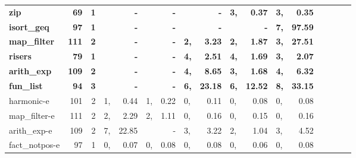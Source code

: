 \begin{table*}
\begin{center}
\begin{tabular}{|l|r|r|p{0pt}r|p{0pt}r|p{0pt}r|p{0pt}r|p{0pt}r|p{0pt}r|p{0pt}r|}
\bf zip               & \bf   69 & \bf 1 & \bf     & \bf       - & \bf     & \bf       - & \bf     & \bf       - & \bf  3, & \bf    0.37 & \bf  3, & \bf    0.35 \\
\bf isort\_geq        & \bf   97 & \bf 1 & \bf     & \bf       - & \bf     & \bf       - & \bf     & \bf       - & \bf     & \bf       - & \bf  7, & \bf   97.59 \\
\bf map\_filter       & \bf  111 & \bf 2 & \bf     & \bf       - & \bf     & \bf       - & \bf  2, & \bf    3.23 & \bf  2, & \bf    1.87 & \bf  3, & \bf   27.51 \\
\bf risers            & \bf   79 & \bf 1 & \bf     & \bf       - & \bf     & \bf       - & \bf  4, & \bf    2.51 & \bf  4, & \bf    1.69 & \bf  3, & \bf    2.07 \\
\bf arith\_exp        & \bf  109 & \bf 2 & \bf     & \bf       - & \bf     & \bf       - & \bf  4, & \bf    8.65 & \bf  3, & \bf    1.68 & \bf  4, & \bf    6.32 \\
\bf fun\_list         & \bf   94 & \bf 3 & \bf     & \bf       - & \bf     & \bf       - & \bf  6, & \bf   23.18 & \bf  6, & \bf   12.52 & \bf  8, & \bf   33.15 \\
harmonic-e        &  101 & 2 &  1, &    0.44 &  1, &    0.22 &  0, &    0.11 &  0, &    0.08 &  0, &    0.08 \\
map\_filter-e     &  111 & 2 &  2, &    2.29 &  2, &    1.11 &  0, &    0.16 &  0, &    0.15 &  0, &    0.16 \\
arith\_exp-e      &  109 & 2 &  7, &   22.85 &     &       - &  3, &    3.22 &  2, &    1.04 &  3, &    4.52 \\
fact\_notpos-e    &   97 & 1 &  0, &    0.07 &  0, &    0.08 &  0, &    0.08 &  0, &    0.06 &  0, &    0.08 \\
\hline
\end{tabular}
\end{center}
\end{table*}


